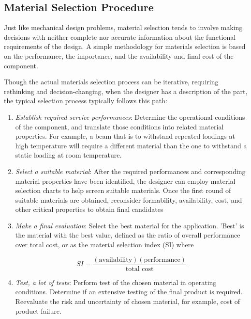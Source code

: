 \documentclass[a4paper,openany,12pt]{book}
\begin{document}
\subsection{Material Selection Procedure}
\label{sec:org7f22167}
Just like mechanical design problems, material selection tends to
involve making decisions with neither complete nor accurate information
about the functional requirements of the design. A simple methodology
for materials selection is based on the performance, the importance, and
the availability and final cost of the component.

Though the actual materials selection process can be iterative,
requiring rethinking and decision-changing, when the designer has a
description of the part, the typical selection process typically follows
this path:

\begin{enumerate}
\item \emph{Establish required service performances}: Determine the operational
conditions of the component, and translate those conditions into
related material properties. For example, a beam that is to withstand
repeated loadings at high temperature will require a different
material than the one to withstand a static loading at room
temperature.

\item \emph{Select a suitable material}: After the required performances and
corresponding material properties have been identified, the designer
can employ material selection charts to help screen suitable
materials. Once the first round of suitable materials are obtained,
reconsider formability, availability, cost, and other critical
properties to obtain final candidates

\item \emph{Make a final evaluation}: Select the best material for the
application. 'Best' is the material with the best value, defined as
the ratio of overall performance over total cost, or as the material
selection index (SI) where

$$SI = \frac{(\text{availability})(\text{performance})}{\text{total cost}}$$

\item \emph{Test, a lot of tests}: Perform test of the chosen material in
operating conditions. Determine if an extensive testing of the final
product is required. Reevaluate the risk and uncertainty of chosen
material, for example, cost of product failure.
\end{enumerate}
\end{document}
